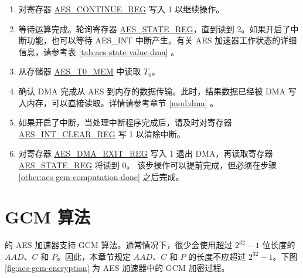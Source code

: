\documentclass[main\_\_CN.tex]{subfiles}
\begin{document}
\begin{enumerate}
    \item 对寄存器 \hyperref[regdesc:AESCONTINUEREG]{AES\_CONTINUE\_REG} 写入 1 以继续操作。
    \item \label{other:aes-gcm-computation-done} 等待运算完成。轮询寄存器 \hyperref[regdesc:AESSTATEREG]{AES\_STATE\_REG}，直到读到 2。如果开启了中断功能，也可以等待 AES\_INT 中断产生。有关 AES 加速器工作状态的详细信息，请参考表 \ref{tab:aes-state-value-dma} \textit{}。
    \item 从存储器 \hyperref[memdesc:AEST0MEM]{AES\_T0\_MEM} 中读取 $T_0$。
    \item 确认 DMA 完成从 AES 到内存的数据传输。此时，结果数据已经被 DMA 写入内存，可以直接读取。详情请参考章节 \ref{mod:dma} \textit{}。
    \item 如果开启了中断，当处理中断程序完成后，请及时对寄存器 \hyperref[regdesc:AESINTCLEARREG]{AES\_INT\_CLEAR\_REG} 写 1 以清除中断。
    \item 对寄存器 \hyperref[regdesc:AESDMAEXITREG]{AES\_DMA\_EXIT\_REG} 写入 1 退出 DMA，再读取寄存器 \hyperref[regdesc:AESSTATEREG]{AES\_STATE\_REG} 将读到 0。
    该步操作可以提前完成，但必须在步骤 \ref{other:aes-gcm-computation-done} 之后完成。
\end{enumerate}


\section{GCM 算法}\label{sec:aes-gcm-algorithm}

\chipname{} 的 AES 加速器支持 GCM 算法。通常情况下，很少会使用超过 \begin{math}2^{32}-1\end{math} 位长度的 \begin{math}AAD\end{math}、\begin{math}C\end{math} 和 \begin{math}P\end{math}。因此，本章节规定 \begin{math}AAD\end{math}、\begin{math}C\end{math} 和 \begin{math}P\end{math} 的长度不应超过 \begin{math}2^{32}-1\end{math}。下图 \ref{fig:aes-gcm-encryption} 为 \chipname{} AES 加速器中的 GCM 加密过程。
\end{document}
